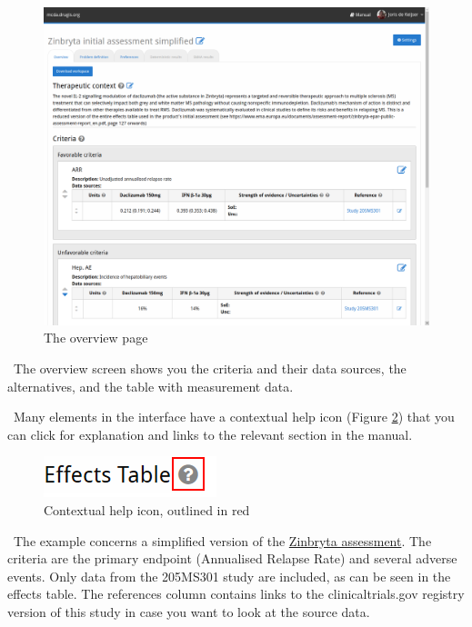 \documentclass[00_mcda_tutorial.tex]{subfiles}
\begin{document}
\begin{figure}[!h]
    \centering
	\includegraphics[width=\textwidth]{fig/overviewPage.png}
    \caption{The overview page}
	\label{fig:overview_page}
\end{figure}

\noindent \faGraduationCap \, The overview screen shows you the criteria and their data sources, the alternatives, and the table with measurement data.
\newline

\noindent \faLightbulbO \, Many elements in the interface have a contextual help icon (Figure \ref{fig:tooltip}) that you can click for explanation and links to the relevant section in the manual.
\newline

\begin{figure}[!h]
    \centering
	\includegraphics[width=.3\textwidth]{fig/contextHelp.png}
    \caption{Contextual help icon, outlined in red}
	\label{fig:tooltip}
\end{figure}

\noindent \faGraduationCap \, The example concerns a simplified version of the \href{https://www.ema.europa.eu/en/medicines/human/EPAR/zinbryta#authorisation-details-section}{Zinbryta assessment}. The criteria are the primary endpoint (Annualised Relapse Rate) and several adverse events. Only data from the 205MS301 study are included, as can be seen in the effects table. The references column contains links to the clinicaltrials.gov registry version of this study in case you want to look at the source data.
\end{document}
